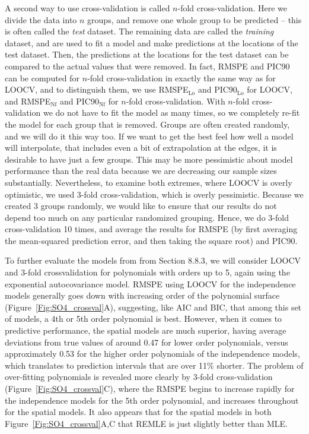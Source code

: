 \documentclass[12pt, titlepage]{article}
\begin{document}
A second way to use cross-validation is called $n$-fold cross-validation.  Here we divide the data into $n$ groups, and remove one whole group to be predicted -- this is often called the \textit{test} dataset.  The remaining data are called the \textit{training} dataset, and are used to fit a model and make predictions at the locations of the test dataset.  Then, the predictions at the locations for the test dataset can be compared to the actual values that were removed.  In fact, RMSPE and PIC90 can be computed for $n$-fold cross-validation in exactly the same way as for LOOCV, and to distinguish them, we use RMSPE$_{\textrm{Lo}}$ and PIC90$_{\textrm{Lo}}$ for LOOCV, and RMSPE$_{\textrm{Nf}}$ and PIC90$_{\textrm{Nf}}$ for $n$-fold cross-validation. With $n$-fold cross-validation we do not have to fit the model as many times, so we completely re-fit the model for each group that is removed.  Groups are often created randomly, and we will do it this way too.  If we want to get the best feel how well a model will interpolate, that includes even a bit of extrapolation at the edges, it is desirable to have just a few groups.  This may be more pessimistic about model performance than the real data because we are decreasing our sample sizes substantially.  Nevertheless, to examine both extremes, where LOOCV is overly optimistic, we used 3-fold cross-validation, which is overly pessimistic.  Because we created 3 groups randomly, we would like to ensure that our results do not depend too much on any particular randomized grouping.  Hence, we do 3-fold cross-validation 10 times, and average the results for RMSPE (by first averaging the mean-squared prediction error, and then taking the square root) and PIC90.

To further evaluate the models from from Section 8.8.3, we will consider LOOCV and 3-fold crossvalidation for polynomials with orders up to 5, again using the exponential autocovariance model.  RMSPE using LOOCV for the independence models generally goes down with increasing order of the polynomial surface (Figure~\ref{Fig:SO4_crossval}A), suggesting, like AIC and BIC, that among this set of models, a 4th or 5th order polynomial is best.  However, when it comes to predictive performance, the spatial models are much superior, having average deviations from true values of around 0.47 for lower order polynomials, versus approximately 0.53 for the higher order polynomials of the independence models, which translates to prediction intervals that are over 11\% shorter.  The problem of over-fitting polynomials is revealed more clearly by 3-fold cross-validation (Figure~\ref{Fig:SO4_crossval}C), where the RMSPE begins to increase rapidly for the independence models for the 5th order polynomial, and increases throughout for the spatial models. It also appears that for the spatial models in both Figure~\ref{Fig:SO4_crossval}A,C that REMLE is just slightly better than MLE.
\end{document}

